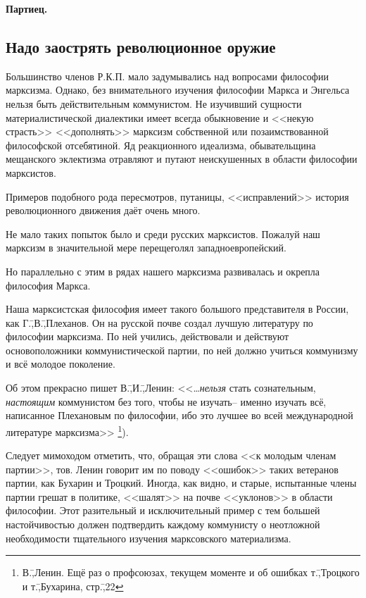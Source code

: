 \begin{flushright}
 \textbf{Партиец.}\hspace*{2em}
\end{flushright}

\subsection*{Надо заострять революционное оружие}
\label{subsec:9.2}

Большинство членов Р.К.П. мало задумывались над вопросами философии марксизма. Однако, без внимательного изучения философии Маркса и Энгельса нельзя быть действительным коммунистом. Не изучивший сущности материалистической диалектики имеет всегда обыкновение и <<некую страсть>> <<дополнять>> марксизм собственной или позаимствованной философской отсебятиной. Яд реакционного идеализма, обывательщина мещанского эклектизма отравляют и путают неискушенных в области философии марксистов.

Примеров подобного рода пересмотров, путаницы, <<исправлений>> история революционного движения даёт очень много.

Не мало таких попыток было и среди русских марксистов. Пожалуй наш марксизм в значительной мере перещеголял западноевропейский.

Но параллельно с этим в рядах нашего марксизма развивалась и окрепла философия Маркса.

Наша марксистская философия имеет такого большого представителя в России, как Г.\=,В.\=,Плеханов. Он на русской почве создал лучшую литературу по философии марксизма. По ней учились, действовали и действуют основоположники коммунистической партии, по ней должно учиться коммунизму и всё молодое поколение.

Об этом прекрасно пишет В.\=,И.\=,Ленин: <<\dots\emph{нельзя} стать сознательным, \emph{настоящим} коммунистом без того, чтобы не изучать\--- именно изучать всё, написанное Плехановым по философии, ибо это лучшее во всей международной литературе марксизма>> \footnote{В.\=,Ленин. Ещё раз о профсоюзах, текущем моменте и об ошибках т.\=,Троцкого и т.\=,Бухарина, стр.\=,22}).

Следует мимоходом отметить, что, обращая эти слова <<к молодым членам партии>>, тов. Ленин говорит им по поводу <<ошибок>> таких ветеранов партии, как Бухарин и Троцкий. Иногда, как видно, и старые, испытанные члены партии грешат в политике, <<шалят>> на почве <<уклонов>> в области философии. Этот разительный и исключительный пример с тем большей настойчивостью должен подтвердить каждому коммунисту о неотложной необходимости тщательного изучения марксовского материализма.

